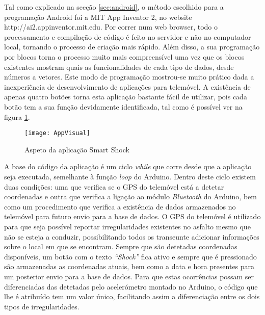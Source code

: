 Tal como explicado na secção \ref{sec:android}, o método escolhido para a programação Android foi a MIT App Inventor 2, no website http://ai2.appinventor.mit.edu.
Por correr num web browser, todo o processamento e compilação de código é feito no servidor e não no computador local, tornando o processo de criação mais rápido.
Além disso, a sua programação por blocos torna o processo muito mais compreensível uma vez que os blocos existentes mostram quais as funcionalidades de cada tipo de dados, desde números a vetores.
Este modo de programação mostrou-se muito prático dada a inexperiência de desenvolvimento de aplicações para telemóvel.
A existência de apenas quatro botões torna esta aplicação bastante fácil de utilizar, pois cada botão tem a sua função devidamente identificada, tal como é possível ver na figura \ref{fig:Aspeto_da_aplicação_Smart_Shock}.


\begin{figure}[!htbp]
	\centering
	\texttt{[image: AppVisual]}
	\caption{Aspeto da aplicação Smart Shock}
	\label{fig:Aspeto_da_aplicação_Smart_Shock}
\end{figure}

A base do código da aplicação é um ciclo \emph{while} que corre desde que a aplicação seja executada, semelhante à função \emph{loop} do Arduino.
Dentro deste ciclo existem duas condições: uma que verifica se o GPS do telemóvel está a detetar coordenadas e outra que verifica a ligação ao módulo \emph{Bluetooth} do Arduino, bem como um procedimento que verifica a existência de dados armazenados no telemóvel para futuro envio para a base de dados.
O GPS do telemóvel é utilizado para que seja possível reportar irregularidades existentes no asfalto mesmo que não se esteja a conduzir, possibilitando todos os transeunte adicionar informações sobre o local em que se encontram.
Sempre que são detetadas coordenadas disponíveis, um botão com o texto \emph{``Shock''} fica ativo e sempre que é pressionado são armazenadas as coordenadas atuais, bem como a data e hora presentes para um posterior envio para a base de dados.
Para que estas ocorrências possam ser diferenciadas das detetadas pelo acelerómetro montado no Arduino, o código que lhe é atribuído tem um valor único, facilitando assim a diferenciação entre os dois tipos de irregularidades.

